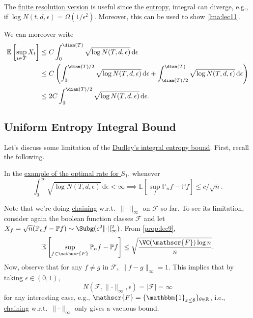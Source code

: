 The \hyperref[col:Dudley-integral-entropy-bound-finite-resolution]{finite resolution version} is useful since the \hyperref[def:metric-entropy]{entropy}, integral can diverge, e.g., if \(\log N(t, d, \epsilon ) = \Omega (1 / \epsilon ^2)\). Moreover, this can be used to show \autoref{lma:lec11}.

\begin{remark}
	We can moreover write
	\[
		\begin{split}
			\mathbb{E}_{}\left[\sup _{t\in T} X_t \right]
			 & \leq C \int_{0}^{\diam(T) } \sqrt{\log N(T, d, \epsilon )}  \,\mathrm{d}\epsilon                                                                                                         \\
			 & \leq C \left( \int_{0}^{\diam(T) / 2} \sqrt{\log N(T, d, \epsilon )}  \,\mathrm{d}\epsilon + \int_{\diam(T) / 2}^{\diam(T) } \sqrt{\log N(T, d, \epsilon )} \,\mathrm{d}\epsilon \right) \\
			 & \leq 2C \int_{0}^{\diam(T) / 2} \sqrt{\log N(T, d, \epsilon )} \,\mathrm{d}\epsilon .
		\end{split}
	\]
\end{remark}

\subsection{Uniform Entropy Integral Bound}
Let's discuss some limitation of the \hyperref[col:Dudley-integral-entropy-bound]{Dudley's integral entropy bound}. First, recall the following.

\begin{prev}
	In the \hyperref[eg:optimal-EP-supremum-S1]{example of the optimal rate for \(S_1\)}, whenever
	\[
		\int_{0}^{\infty} \sqrt{\log N(T, d, \epsilon )} \,\mathrm{d}\epsilon < \infty
		\implies \mathbb{E}_{}\left[\sup _f \mathbb{P} _n f - \mathbb{P} f \right] \leq c / \sqrt{n}.
	\]
\end{prev}

Note that we're doing \hyperref[note:chaining]{chaining} w.r.t.\ \(\lVert \cdot \rVert _\infty \) on \(\mathscr{F} \) so far. To see its limitation, consider again the boolean function classes \(\mathscr{F} \) and let \(X_f = \sqrt{n} (\mathbb{P} _n f - \mathbb{P} f) \sim \Subg (c^2 \lVert \cdot \rVert ^2_\infty )\). From \autoref{prop:lec9},
\[
	\mathbb{E}_{}\left[\sup _{f\in \mathscr{F} } \mathbb{P} _n f - \mathbb{P} f \right]
	\leq \sqrt{\frac{\VC(\mathscr{F} ) \log n }{n}}.
\]
Now, observe that for any \(f \neq g\) in \(\mathscr{F} \), \(\lVert f - g \rVert _\infty = 1\). This implies that by taking \(\epsilon \in (0, 1)\),
\[
	N(\mathscr{F} , \lVert \cdot \rVert _\infty , \epsilon ) = \vert \mathscr{F} \vert = \infty
\]
for any interesting case, e.g., \(\mathscr{F} = \{ \mathbbm{1}_{x \leq \theta } \}_{\theta \in \mathbb{R}} \), i.e., \hyperref[note:chaining]{chaining} w.r.t.\ \(\lVert \cdot \rVert _\infty \) only gives a vacuous bound.

